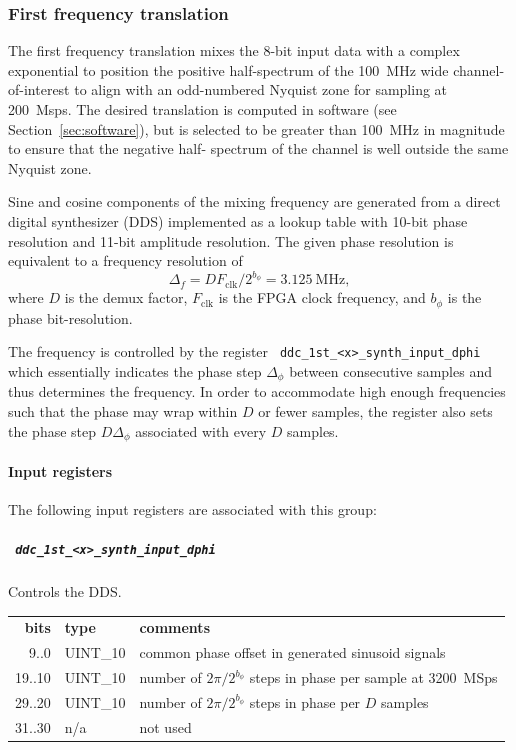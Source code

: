 \documentclass[a4paper,10pt]{article}
\newcommand{\ilcode}[1]{\begingroup
	\setlength{\fboxsep}{1pt}\colorbox{ilcodebg}{\small\tt%
		#1%
	}\endgroup}
\begin{document}
\subsubsection{First frequency translation}
\label{sec:gwdcpddc1}
The first frequency translation mixes the 8-bit input data with a 
complex exponential to position the positive half-spectrum of the 
100~MHz wide channel-of-interest to align with an odd-numbered Nyquist 
zone for sampling at 200~Msps. The desired translation is computed in 
software (see Section~\ref{sec:software}), but is selected to be 
greater than 100~MHz in magnitude to ensure that the negative half-
spectrum of the channel is well outside the same Nyquist zone.

Sine and cosine components of the mixing frequency are generated from a 
direct digital synthesizer (DDS) implemented as a lookup table with 
10-bit phase resolution and 11-bit amplitude resolution. The given 
phase resolution is equivalent to a frequency resolution of
\begin{equation}
	\label{eq:ddc1freqres}
	\Delta_f = D F_{\text{clk}} / 2^{b_{\phi}} = 3.125~\text{MHz},
\end{equation}
where $D$ is the demux factor, $F_{\text{clk}}$ is the FPGA clock 
frequency, and $b_{\phi}$ is the phase bit-resolution.

The frequency is controlled by the register 
\ilcode{ddc\_1st\_<x>\_synth\_input\_dphi} which essentially indicates 
the phase step $\Delta_{\phi}$ between consecutive samples and thus 
determines the frequency. In order to accommodate high enough 
frequencies such that the phase may wrap within $D$ or fewer samples, 
the register also sets the phase step $D \Delta_{\phi}$ associated with 
every $D$ samples.

\paragraph{Input registers}
The following input registers are associated with this group:

\subparagraph{\ilcode{ddc\_1st\_<x>\_synth\_input\_dphi}}
Controls the DDS.\\
\begin{tabular}{rll}
	{\bf bits} & {\bf type} & {\bf comments}\\
	9..0   & UINT\_10 & common phase offset in generated sinusoid signals\\
	19..10 & UINT\_10 & number of $2\pi/2^{b_{\phi}}$ steps in phase per sample at 3200~MSps\\
	29..20 & UINT\_10 & number of $2\pi/2^{b_{\phi}}$ steps in phase per $D$ samples\\
	31..30 & n/a  & not used
\end{tabular}
\end{document}
